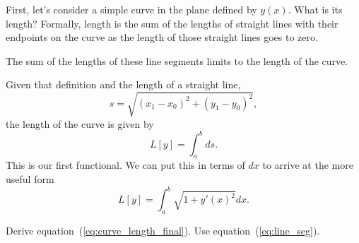 First, let's consider a simple curve in the plane defined by $y(x)$. What is its length? Formally, length is the sum of the lengths of straight lines with their endpoints on the curve as the length of those straight lines goes to zero. 
\begin{marginfigure}
  \caption{The sum of the lengths of these line segments limits to the length of the curve.}
\end{marginfigure}
Given that definition and the length of a straight line,
\begin{equation}
  \label{eq:line_seg}
  s = \sqrt{(x_1 - x_0)^2 + (y_1 - y_0)^2},  
\end{equation}
the length of the curve is given by
\begin{equation}
  \label{eq:curve_length_1}
  L[y] = \int_a^b ds.
\end{equation}
This is our first functional. We can put this in terms of $dx$ to arrive at the more useful form
\begin{equation}
  \label{eq:curve_length_final}
  L[y] = \int_a^b \sqrt{1 + y'(x)^2} dx.
\end{equation}

\begin{Exercise}
  Derive equation~(\ref{eq:curve_length_final}). Use equation~(\ref{eq:line_seg}).
\end{Exercise}


